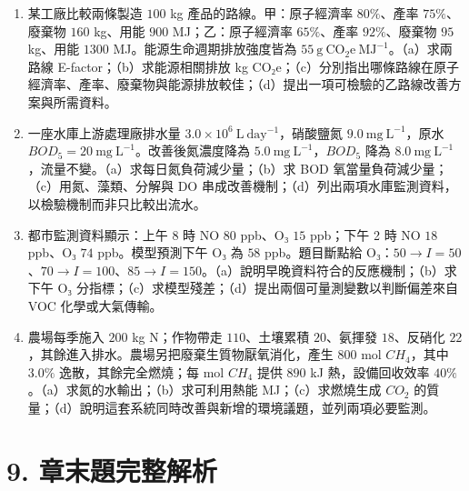 \documentclass[11pt,a4paper]{article}
\providecommand{\tightlist}{%
  \setlength{\itemsep}{0pt}\setlength{\parskip}{0pt}}
\begin{document}
\begin{enumerate}
\def\labelenumi{\arabic{enumi}.}
\setcounter{enumi}{12}
\tightlist
\item
  某工廠比較兩條製造 \(100\) kg 產品的路線。甲：原子經濟率 \(80\%\)、產率 \(75\%\)、廢棄物 \(160\) kg、用能 \(900\) MJ；乙：原子經濟率 \(65\%\)、產率 \(92\%\)、廢棄物 \(95\) kg、用能 \(1300\) MJ。能源生命週期排放強度皆為 \(55\ \mathrm{g\ CO_2e\ MJ^{-1}}\)。（a）求兩路線 E-factor；（b）求能源相關排放 kg CO₂e；（c）分別指出哪條路線在原子經濟率、產率、廢棄物與能源排放較佳；（d）提出一項可檢驗的乙路線改善方案與所需資料。
\item
  一座水庫上游處理廠排水量 \(3.0\times10^6\ \mathrm{L\ day^{-1}}\)，硝酸鹽氮 \(9.0\ \mathrm{mg\ L^{-1}}\)，原水 \(BOD_5=20\ \mathrm{mg\ L^{-1}}\)。改善後氮濃度降為 \(5.0\ \mathrm{mg\ L^{-1}}\)，\(BOD_5\) 降為 \(8.0\ \mathrm{mg\ L^{-1}}\)，流量不變。（a）求每日氮負荷減少量；（b）求 BOD 氧當量負荷減少量；（c）用氮、藻類、分解與 DO 串成改善機制；（d）列出兩項水庫監測資料，以檢驗機制而非只比較出流水。
\item
  都市監測資料顯示：上午 8 時 NO \(80\) ppb、O₃ \(15\) ppb；下午 2 時 NO \(18\) ppb、O₃ \(74\) ppb。模型預測下午 O₃ 為 \(58\) ppb。題目斷點給 O₃：\(50\to I=50\)、\(70\to I=100\)、\(85\to I=150\)。（a）說明早晚資料符合的反應機制；（b）求下午 O₃ 分指標；（c）求模型殘差；（d）提出兩個可量測變數以判斷偏差來自 VOC 化學或大氣傳輸。
\item
  農場每季施入 \(200\) kg N；作物帶走 \(110\)、土壤累積 \(20\)、氨揮發 \(18\)、反硝化 \(22\)，其餘進入排水。農場另把廢棄生質物厭氧消化，產生 \(800\) mol \(CH_4\)，其中 \(3.0\%\) 逸散，其餘完全燃燒；每 mol \(CH_4\) 提供 \(890\) kJ 熱，設備回收效率 \(40\%\)。（a）求氮的水輸出；（b）求可利用熱能 MJ；（c）求燃燒生成 \(CO_2\) 的質量；（d）說明這套系統同時改善與新增的環境議題，並列兩項必要監測。
\end{enumerate}

\section{9. 章末題完整解析}\label{ux7ae0ux672bux984cux5b8cux6574ux89e3ux6790}
\end{document}
